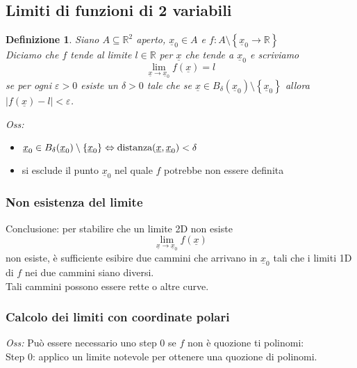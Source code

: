 \documentclass{scrreprt}
\newtheorem{defn}{Definizione}
\newenvironment{definition}{\begin{mdframed}[backgroundcolor=Ivory2]\begin{defn}}{\end{defn}\end{mdframed}}
\begin{document}
\subsection{Limiti di funzioni di 2 variabili}

\begin{definition}
	Siano $A \subseteq \mathbb{R}^2$ aperto, $\underline{x}_0 \in A$ e $f: A \setminus \left\{\underline{x}_0 \to \mathbb{R}\right\}$\\
	Diciamo che $f$ tende al limite $l \in \mathbb{R}$ per $\underline{x}$ che tende a $\underline{x}_0$ e scriviamo
	\begin{equation}
		\lim_{\underline{x} \to \underline{x}_0} f(\underline{x}) = l
	\end{equation}
	se per ogni $\varepsilon > 0$ esiste un $\delta > 0$ tale che se $\underline{x} \in B_{\delta}(\underline{x}_0) \setminus \left\{\underline{x}_0\right\} $ allora $|f(\underline{x})-l| < \varepsilon$.
\end{definition}


\emph{Oss:} \begin{itemize}
	\item $\underline{x}_0 \in B_{\delta}(\underline{x}_0) \setminus \left\{\underline{x}_0\right\} \Leftrightarrow \textnormal{distanza}(\underline{x}, \underline{x}_0) < \delta$
	\item si esclude il punto $\underline{x}_0$ nel quale $f$ potrebbe non essere definita
\end{itemize}

\subsubsection*{Non esistenza del limite}
Conclusione: per stabilire che un limite 2D non esiste
\begin{equation}
	\lim_{\underline{x} \to \underline{x}_0} f(\underline{x})
\end{equation}
non esiste, è sufficiente esibire due cammini che arrivano in $\underline{x}_0$ tali che i limiti 1D di $f$ nei due cammini siano diversi.\\
Tali cammini possono essere rette o altre curve.

\subsubsection{Calcolo dei limiti con coordinate polari}
\emph{Oss:} Può essere necessario uno step 0 se $f$ non è quozione ti polinomi:\\
Step 0: applico un limite notevole per ottenere una quozione di polinomi.\\
\end{document}
